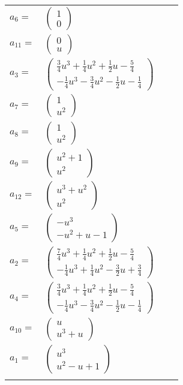 \documentclass[1p]{elsarticle_modified}
\theoremstyle{definition}
\begin{document}
\begin{tabular}{m{7pt} m{180pt} m{7pt} m{180pt} }
\flushright $a_{6}=$&$\begin{pmatrix}1\\0\end{pmatrix}$ \\
\flushright $a_{11}=$&$\begin{pmatrix}0\\u\end{pmatrix}$ \\
\flushright $a_{3}=$&$\begin{pmatrix}\frac{3}{4} u^3+\frac{1}{4} u^2+\frac{1}{2} u-\frac{5}{4}\\-\frac{1}{4} u^3-\frac{3}{4} u^2-\frac{1}{2} u-\frac{1}{4}\end{pmatrix}$ \\
\flushright $a_{7}=$&$\begin{pmatrix}1\\u^2\end{pmatrix}$ \\
\flushright $a_{8}=$&$\begin{pmatrix}1\\u^2\end{pmatrix}$ \\
\flushright $a_{9}=$&$\begin{pmatrix}u^2+1\\u^2\end{pmatrix}$ \\
\flushright $a_{12}=$&$\begin{pmatrix}u^3+u^2\\u^2\end{pmatrix}$ \\
\flushright $a_{5}=$&$\begin{pmatrix}- u^3\\- u^2+u-1\end{pmatrix}$ \\
\flushright $a_{2}=$&$\begin{pmatrix}\frac{7}{4} u^3+\frac{1}{4} u^2+\frac{1}{2} u-\frac{5}{4}\\-\frac{1}{4} u^3+\frac{1}{4} u^2-\frac{3}{2} u+\frac{3}{4}\end{pmatrix}$ \\
\flushright $a_{4}=$&$\begin{pmatrix}\frac{3}{4} u^3+\frac{1}{4} u^2+\frac{1}{2} u-\frac{5}{4}\\-\frac{1}{4} u^3-\frac{3}{4} u^2-\frac{1}{2} u-\frac{1}{4}\end{pmatrix}$ \\
\flushright $a_{10}=$&$\begin{pmatrix}u\\u^3+u\end{pmatrix}$ \\
\flushright $a_{1}=$&$\begin{pmatrix}u^3\\u^2- u+1\end{pmatrix}$\\&\end{tabular}
\end{document}
